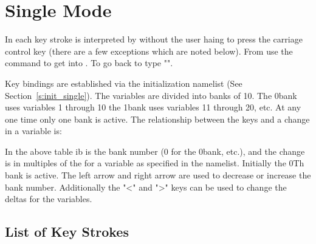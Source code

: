 \chapter{Single Mode}
\label{c:single}

In  each key stroke is interpreted by \tao without the user haing to press 
the carriage control key (there are a few exceptions which are noted below). From 
use the  command to get into . To go back to  type
"".

Key bindings are established via the  initialization namelist 
(See Section~\ref{s:init_single}). 
The variables are divided into banks of 10. The 0\Th bank uses variables 1
through 10 the 1\St bank uses variables 11 through 20, etc. 
At any one time only one bank is active. The relationship between
the keys and a change in a variable is:
In the above table ib is the bank number (0 for the 0\Th bank, etc.), 
and the change is in
multiples of the  for a variable as specified in the 
namelist. Initially the 0Th bank is active. The
left arrow and right arrow are used to decrease or increase the bank number. 
Additionally the "<" and ">" keys can be used to change the deltas for the variables. 

\section{List of Key Strokes}
\label{s:keys}

